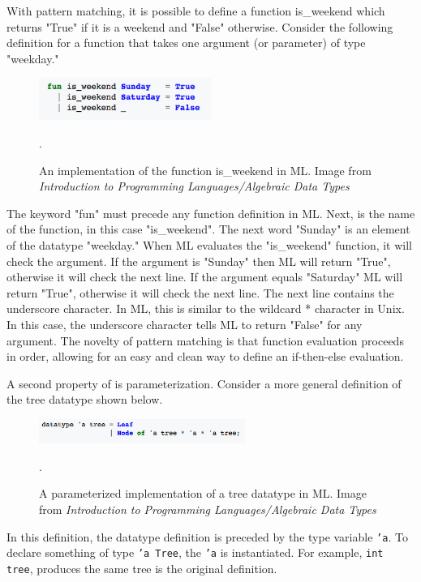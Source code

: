 \documentclass[../../main/main.tex]{subfiles}
\begin{document}
With pattern matching, it is possible to define a function is_weekend which returns "True" if it is a weekend and "False" otherwise.  Consider the following definition for a function that takes one argument (or parameter) of type "weekday."


\begin{figure}[h]
\centering
\includegraphics[width=0.5\textwidth]{../figures/isweekend}
\caption{\label{isweekend} An implementation of the function is_weekend in ML.  Image from \textit{Introduction to Programming Languages/Algebraic Data Types} \cite{types} }.  
\end{figure}


The keyword "fun" must precede any function definition in ML. Next, is the name of the function, in this case "is_weekend".  The next word "Sunday" is an element of the datatype "weekday."  When ML evaluates the "is_weekend" function, it will check the argument.  If the argument is "Sunday" then ML will return "True", otherwise it will check the next line.  If the argument equals "Saturday" ML will return "True", otherwise it will check the next line.  The next line contains the underscore character.  In ML, this is similar to the wildcard * character in Unix.  In this case, the underscore character tells ML to return "False" for any argument.  The novelty of pattern matching is that function evaluation proceeds in order, allowing for an easy and clean way to define an if-then-else evaluation.

A second property of  is parameterization.  Consider a more general definition of the tree datatype shown below.

\begin{figure}[h]
\centering
\includegraphics[width=0.6\textwidth]{../figures/treeparam}
\caption{\label{treeparam} A parameterized implementation of a tree datatype in ML.  Image from \textit{Introduction to Programming Languages/Algebraic Data Types} \cite{types} }.  
\end{figure}

In this definition, the datatype definition is preceded by the type variable \texttt{'a}.  To declare something of type \texttt{'a Tree}, the \texttt{'a} is instantiated.  For example, \texttt{int tree}, produces the same tree is the original definition.  
\end{document}
